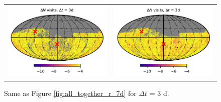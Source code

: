 \documentclass[preprintm,linenumbers]{aastex631}
\begin{document}
\begin{figure}
\begin{tabular}{@{}c@{}c@{}}
         \includegraphics{results/skymaps_cutout/skymaps_cutout_delta_first_year_one_snap_v4_0_10yrs_db_noDD_noTwi_tscale-3_nside-256_doAllTemplateMetrics_reduceCount_g_noDD_noTwi.pdf} &
         \includegraphics{results/skymaps_cutout/skymaps_cutout_delta_first_year_one_snap_v4_0_10yrs_db_noDD_noTwi_tscale-3_nside-256_doAllTemplateMetrics_reduceCount_r_noDD_noTwi.pdf} \\

   \end{tabular}

        \caption{
        Same as Figure \ref{fig:all_together_r_7d} for $\Delta t$ = 3 d. 
        }
        \label{fig:all_together_r_3d}
	\end{figure}

  
\end{document}
